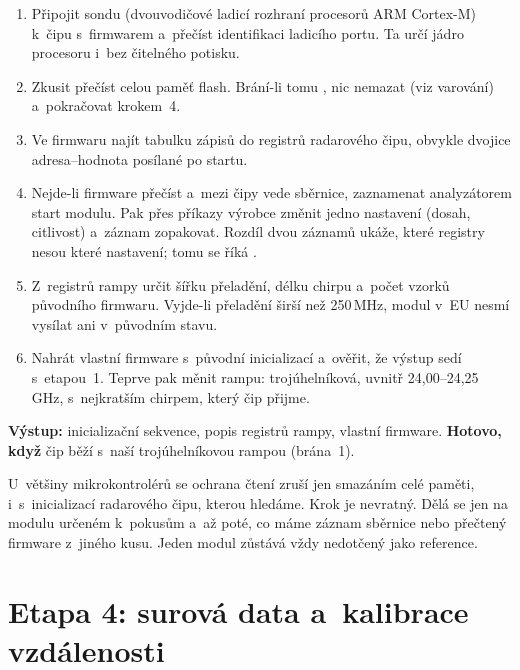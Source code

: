 \documentclass[czech]{skyren}
\begin{document}
\begin{enumerate}
\item Připojit sondu  (dvouvodičové ladicí rozhraní procesorů
  ARM Cortex-M) k~čipu s~firmwarem a~přečíst identifikaci ladicího portu. Ta
  určí jádro procesoru i~bez čitelného potisku.
\item Zkusit přečíst celou paměť flash. Brání-li tomu , nic nemazat (viz varování) a~pokračovat krokem~4.
\item Ve firmwaru najít tabulku zápisů do registrů radarového čipu, obvykle
  dvojice adresa--hodnota posílané po startu.
\item Nejde-li firmware přečíst a~mezi čipy vede sběrnice, zaznamenat
  analyzátorem start modulu. Pak přes příkazy výrobce změnit jedno nastavení
  (dosah, citlivost) a~záznam zopakovat. Rozdíl dvou záznamů ukáže, které
  registry nesou které nastavení; tomu se říká .
\item Z~registrů rampy určit šířku přeladění, délku chirpu a~počet vzorků
  původního firmwaru. Vyjde-li přeladění širší než 250\,MHz, modul v~EU
  nesmí vysílat ani v~původním stavu.
\item Nahrát vlastní firmware s~původní inicializací a~ověřit, že výstup
  sedí s~etapou~1. Teprve pak měnit rampu: trojúhelníková, uvnitř
  24,00--24,25\,GHz, s~nejkratším chirpem, který čip přijme.
\end{enumerate}

\textbf{Výstup:} inicializační sekvence, popis registrů rampy, vlastní
firmware. \textbf{Hotovo, když} čip běží s~naší trojúhelníkovou rampou
(brána~1).

\begin{skyrenwarning}
U~většiny mikrokontrolérů se ochrana čtení zruší jen smazáním celé paměti,
i~s~inicializací radarového čipu, kterou hledáme. Krok je nevratný. Dělá se
jen na modulu určeném k~pokusům a~až poté, co máme záznam sběrnice nebo
přečtený firmware z~jiného kusu. Jeden modul zůstává vždy nedotčený jako
reference.
\end{skyrenwarning}

\section{Etapa 4: surová data a~kalibrace vzdálenosti}
\end{document}
